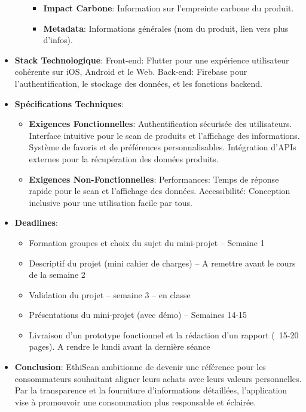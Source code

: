 \begin{itemize}[noitemsep]
\begin{itemize}[noitemsep]
\begin{itemize}[noitemsep]
                        \item \textbf{Impact Carbone}: Information sur l'empreinte carbone du produit.
                        \item \textbf{Metadata}: Informations générales (nom du produit, lien vers plus d'infos).
                    \end{itemize}
          \end{itemize}
    \item \textbf{Stack Technologique}: Front-end: Flutter pour une expérience utilisateur cohérente sur iOS, Android et le Web. Back-end: Firebase pour l'authentification, le stockage des données, et les fonctions backend.
    \item \textbf{Spécifications Techniques}:
          \begin{itemize}[noitemsep]
              \item \textbf{Exigences Fonctionnelles}: Authentification sécurisée des utilisateurs. Interface intuitive pour le scan de produits et l'affichage des informations. Système de favoris et de préférences personnalisables. Intégration d'APIs externes pour la récupération des données produits.
              \item \textbf{Exigences Non-Fonctionnelles}: Performances: Temps de réponse rapide pour le scan et l'affichage des données. Accessibilité: Conception inclusive pour une utilisation facile par tous.
          \end{itemize}
    \item \textbf{Deadlines}:
          \begin{itemize}[noitemsep]
              \item Formation groupes et choix du sujet du mini-projet – Semaine 1
              \item Descriptif du projet (mini cahier de charges) – A remettre avant le cours de la semaine 2
              \item Validation du projet – semaine 3 – en classe
              \item Présentations du mini-projet (avec démo) – Semaines 14-15
              \item Livraison d’un prototype fonctionnel et la rédaction d’un rapport (~15-20 pages). A rendre le lundi avant la dernière séance
          \end{itemize}
    \item \textbf{Conclusion}: EthiScan ambitionne de devenir une référence pour les consommateurs souhaitant aligner leurs achats avec leurs valeurs personnelles. Par la transparence et la fourniture d'informations détaillées, l'application vise à promouvoir une consommation plus responsable et éclairée.
\end{itemize}

